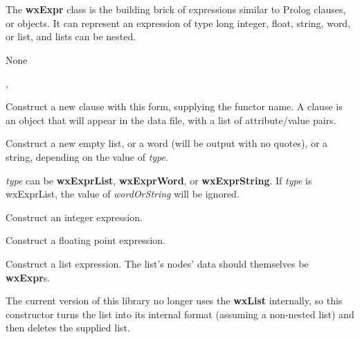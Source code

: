 \section{}\label{wxexpr}

The {\bf wxExpr} class is the building brick of expressions similar to Prolog
clauses, or objects. It can represent an expression of type long integer, float, string, word,
or list, and lists can be nested.


None


, 


\label{wxexprconstr}


Construct a new clause with this form, supplying the functor name. A clause is an object
that will appear in the data file, with a list of attribute/value pairs.


Construct a new empty list, or a word (will be output with no quotes), or a string, depending on the
value of {\it type}.

{\it type} can be {\bf wxExprList}, {\bf wxExprWord}, or {\bf wxExprString}. If {\it type} is wxExprList,
the value of {\it wordOrString} will be ignored.


Construct an integer expression.


Construct a floating point expression.


Construct a list expression. The list's nodes' data should
themselves be {\bf wxExpr}s.

The current version of this library no longer uses the {\bf wxList}
internally, so this constructor turns the list into its internal
format (assuming a non-nested list) and then deletes the supplied
list.


